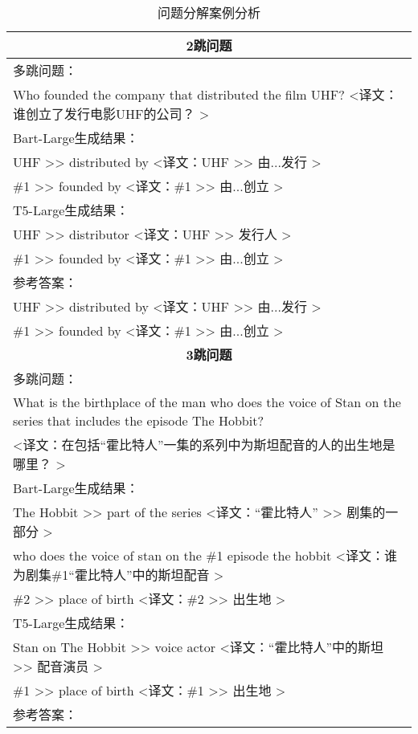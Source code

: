 \begin{table}[htbp]\scriptsize
    \centering
    \caption{问题分解案例分析}
    \begin{tabular}{p{408pt}}
        \hline
        \multicolumn{1}{c}{\bfseries 2跳问题} \\
        \hline
        多跳问题：\\
        Who founded the company that distributed the film UHF? <译文：谁创立了发行电影UHF的公司？ > \\
        \hline
        Bart-Large生成结果： \\
        UHF >> distributed by <译文：UHF >> 由...发行 > \\
        \#1 >> founded by <译文：\#1 >> 由...创立 > \\
        \hline
        T5-Large生成结果： \\
        UHF >> distributor <译文：UHF >> 发行人 > \\
        \#1 >> founded by <译文：\#1 >> 由...创立 > \\
        \hline
        参考答案： \\
        UHF >> distributed by <译文：UHF >> 由...发行 > \\
        \#1 >> founded by <译文：\#1 >> 由...创立 > \\
        \hline
        \multicolumn{1}{c}{\bfseries 3跳问题} \\
        \hline
        多跳问题：\\
        What is the birthplace of the man who does the voice of Stan on the series that includes the episode The Hobbit? \\
        <译文：在包括“霍比特人”一集的系列中为斯坦配音的人的出生地是哪里？ > \\
        \hline
        Bart-Large生成结果： \\
        The Hobbit >> part of the series <译文：“霍比特人” >> 剧集的一部分 > \\
        who does the voice of stan on the \#1 episode the hobbit <译文：谁为剧集\#1“霍比特人”中的斯坦配音 > \\
        \#2 >> place of birth <译文：\#2 >> 出生地 > \\
        \hline
        T5-Large生成结果： \\
        Stan on The Hobbit >> voice actor <译文：“霍比特人”中的斯坦 >> 配音演员 > \\
        \#1 >> place of birth <译文：\#1 >> 出生地 > \\
        \hline
        参考答案： \\

\end{tabular}
\end{table}
